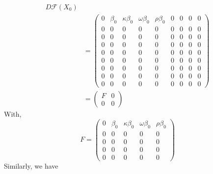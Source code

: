 \documentclass[authoryear,preprint]{elsarticle}
\begin{document}
\begin{equation}
\begin{split}
D \mathcal{F}(X_0) \\
&=  \begin{pmatrix}
0 & \beta_0 & \kappa \beta_0 & \omega \beta_0 & \rho \beta_0 & 0 & 0 & 0 & 0 \\
0 & 0 & 0 & 0 & 0 & 0 &0 & 0 &0 \\
0 & 0 & 0 & 0 & 0 & 0 &0 & 0 &0 \\
0 & 0 & 0 & 0 & 0 & 0 &0 & 0 &0 \\
0 & 0 & 0 & 0 & 0 & 0 &0 & 0 &0 \\
0 & 0 & 0 & 0 & 0 & 0 &0 & 0 &0 \\
0 & 0 & 0 & 0 & 0 & 0 &0 & 0 &0 \\
0 & 0 & 0 & 0 & 0 & 0 &0 & 0 &0 \\
0 & 0 & 0 & 0 & 0 & 0 &0 & 0 &0
 \end{pmatrix}\\
 &=  \begin{pmatrix}
 F & 0\\
 0 & 0
  \end{pmatrix}
\end{split}
\label{eqn:DFE-1}
\end{equation}
%
%
With,
%
%
\begin{equation}
F = \begin{pmatrix}
0 & \beta_0 & \kappa \beta_0 & \omega \beta_0 & \rho \beta_0 \\
0 & 0 & 0 & 0 & 0\\
0 & 0 & 0 & 0 & 0\\
0 & 0 & 0 & 0 & 0\\
0 & 0 & 0 & 0 & 0
  \end{pmatrix}
  \label{eqn:DFE-2}
\end{equation}
%
%
Similarly, we have 
%
%
\end{document}
